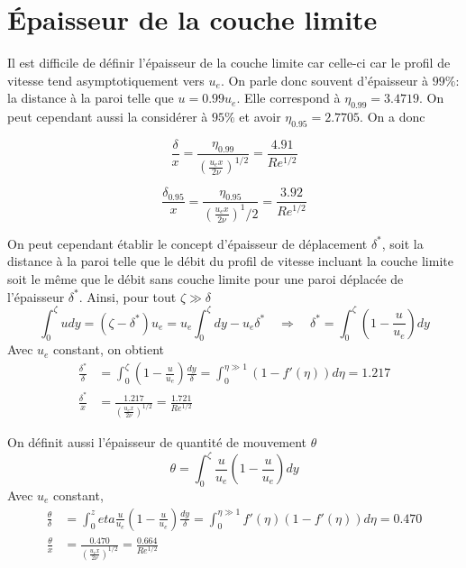   \section{Épaisseur de la couche limite}
    Il est difficile de définir l'épaisseur de la couche limite car celle-ci car le profil de vitesse tend asymptotiquement vers $u_e$. On parle donc souvent d'épaisseur à $99\%$: la distance à la paroi telle que $u=0.99u_e$. Elle correspond à $\eta_{0.99} = 3.4719$. On peut cependant aussi la considérer à $95\%$ et avoir $\eta_{0.95} = 2.7705$. On a donc
    \begin{multicols}{2}
      \begin{equation}
        \frac{\delta}{x} = \frac{\eta_{0.99}}{\left(\frac{u_e x}{2\nu}\right)^{1/2}} = \frac{4.91}{Re^{1/2}}
      \end{equation}

      \begin{equation}
        \frac{\delta_{0.95}}{x} = \frac{\eta_{0.95}}{\left(\frac{u_e x}{2\nu}\right)^1/2} = \frac{3.92}{Re^{1/2}}
      \end{equation}
    \end{multicols}
    On peut cependant établir le concept d'épaisseur de déplacement $\delta^*$, soit la distance à la paroi telle que le débit du profil de vitesse incluant la couche limite soit le même que le débit sans couche limite pour une paroi déplacée de l'épaisseur $\delta^*$. Ainsi, pour tout $\zeta \gg \delta$
    \begin{equation}
      \int_0^\zeta u dy = (\zeta-\delta^*)u_e = u_e \int_0^\zeta dy - u_e \delta^* \quad \Rightarrow \quad \delta^* = \int_0^\zeta \left(1 - \frac{u}{u_e}\right)dy
    \end{equation}
    Avec $u_e$ constant, on obtient
    \begin{equation}
      \begin{aligned}
        \frac{\delta^*}{\delta} &= \int_0^\zeta \left(1 - \frac{u}{u_e}\right) \frac{dy}{\delta} = \int_0^{\eta \gg 1} (1 - f'(\eta))d\eta = 1.217 \\
        \frac{\delta^*}{x} &= \frac{1.217}{\left(\frac{u_e x}{2\nu}\right)^{1/2}} = \frac{1.721}{Re^{1/2}}
      \end{aligned}
    \end{equation}

    On définit aussi l'épaisseur de quantité de mouvement $\theta$
    \begin{equation}
      \theta = \int_0^\zeta \frac{u}{u_e} \left(1-\frac{u}{u_e}\right) dy
    \end{equation}
    Avec $u_e$ constant,
    \begin{equation}
      \begin{aligned}
        \frac{\theta}{\delta} &= \int_0^zeta \frac{u}{u_e}\left(1 - \frac{u}{u_e}\right) \frac{dy}{\delta} = \int_0^{\eta \gg 1} f'(\eta) (1-f'(\eta)) d\eta = 0.470\\
        \frac{\theta}{x} &= \frac{0.470}{\left(\frac{u_e x}{2\nu}\right)^{1/2}} = \frac{0.664}{Re^{1/2}}
      \end{aligned}
    \end{equation}

